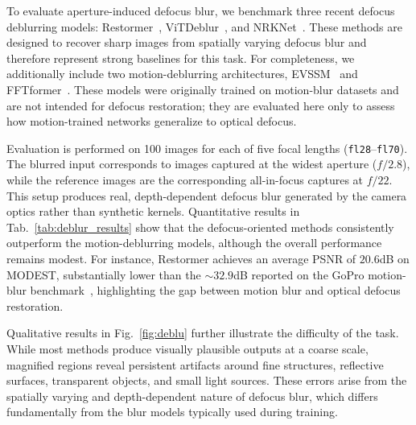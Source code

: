 To evaluate aperture-induced defocus blur, we benchmark three recent defocus deblurring models: Restormer~\cite{zamir2022restormer}, ViTDeblur~\cite{li2022vitdeblur}, and NRKNet~\cite{quan2023neumann}. These methods are designed to recover sharp images from spatially varying defocus blur and therefore represent strong baselines for this task. For completeness, we additionally include two motion-deblurring architectures, EVSSM~\cite{kong2025efficient} and FFTformer~\cite{kong2023efficient}. These models were originally trained on motion-blur datasets and are not intended for defocus restoration; they are evaluated here only to assess how motion-trained networks generalize to optical defocus.


Evaluation is performed on 100 images for each of five focal lengths (\texttt{fl28}–\texttt{fl70}). The blurred input corresponds to images captured at the widest aperture ($f/2.8$), while the reference images are the corresponding all-in-focus captures at $f/22$. This setup produces real, depth-dependent defocus blur generated by the camera optics rather than synthetic kernels. Quantitative results in Tab.~\ref{tab:deblur_results} show that the defocus-oriented methods consistently outperform the motion-deblurring models, although the overall performance remains modest. For instance, Restormer achieves an average PSNR of $20.6$dB on MODEST, substantially lower than the $\sim32.9$dB reported on the GoPro motion-blur benchmark~\cite{nah2017deep}, highlighting the gap between motion blur and optical defocus restoration.

Qualitative results in Fig.~\ref{fig:deblu} further illustrate the difficulty of the task. While most methods produce visually plausible outputs at a coarse scale, magnified regions reveal persistent artifacts around fine structures, reflective surfaces, transparent objects, and small light sources. These errors arise from the spatially varying and depth-dependent nature of defocus blur, which differs fundamentally from the blur models typically used during training. %


